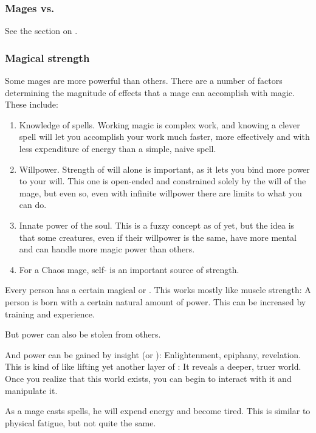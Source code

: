 \subsubsection{Mages vs. \vertices}
See the section on . 





\subsubsection{Magical strength}
Some mages are more powerful than others. There are a number of factors determining the magnitude of effects that a mage can accomplish with magic. These include: 

\begin{enumerate}
  \item Knowledge of spells. 
    Working magic is complex work, and knowing a clever spell will let you accomplish your work much faster, more effectively and with less expenditure of energy than a simple, naive spell. 
  \item Willpower. 
    Strength of will alone is important, as it lets you bind more power to your will. This one is open-ended and constrained solely by the will of the mage, but even so, even with infinite willpower there are limits to what you can do.
  \item Innate power of the soul. 
    This is a fuzzy concept as of yet, but the idea is that some creatures, even if their willpower is the same, have more mental  and can handle more magic power than others. 
  \item   
    For a Chaos mage, self- is an important source of strength. 
\end{enumerate}

Every person has a certain magical  or . 
This works mostly like muscle strength: 
A person is born with a certain natural amount of power. 
This can be increased by training and experience. 

But power can also be stolen from others. 

And power can be gained by insight (or ): 
Enlightenment, epiphany, revelation. 
This is kind of like lifting yet another layer of : 
It reveals a deeper, truer world. 
Once you realize that this world exists, you can begin to interact with it and manipulate it. 

As a mage casts spells, he will expend energy and become tired. This is similar to physical fatigue, but not quite the same. 

